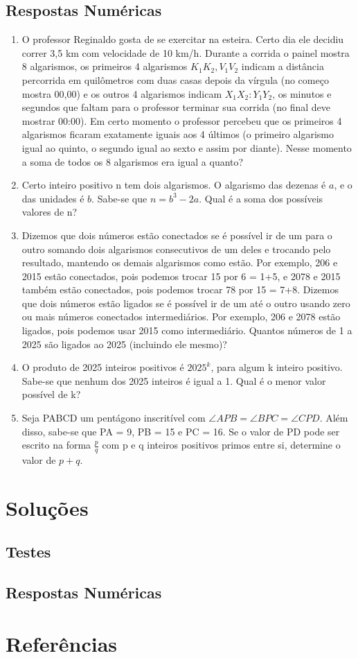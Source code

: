 \documentclass[12pt]{article}
\begin{document}
    \subsection{Respostas Numéricas}
      \begin{enumerate}[label=\textbf{\arabic*.}, start=16]
        \item O professor Reginaldo gosta de se exercitar na esteira. Certo dia ele decidiu correr 3,5 km com velocidade de 10 km/h. Durante a corrida o painel mostra 
          8 algarismos, os primeiros 4 algarismos \(K_1K_2,V_1V_2\) indicam a distância percorrida em quilômetros com duas casas depois da vírgula (no começo mostra 00,00) e os outros
          4 algarismos indicam \(X_1X_2:Y_1Y_2\), os minutos e segundos que faltam para o professor terminar sua corrida (no final deve mostrar 00:00). Em certo momento o professor
          percebeu que os primeiros 4 algarismos ficaram exatamente iguais aos 4 últimos (o primeiro algarismo igual ao quinto, o segundo igual ao sexto e assim por diante). Nesse
          momento a soma de todos os 8 algarismos era igual a quanto?
        \item Certo inteiro positivo n tem dois algarismos. O algarismo das dezenas é \(a\), e o das unidades é \(b\). Sabe-se que \(n = b^3 - 2a\). Qual é a soma dos possíveis
          valores de n?
        \item Dizemos que dois números estão conectados se é possível ir de um para o outro somando dois algarismos consecutivos de um deles e trocando pelo resultado, mantendo
          os demais algarismos como estão. Por exemplo, 206 e 2015 estão conectados, pois podemos trocar 15 por 6 = 1+5, e 2078 e 2015 também estão conectados, pois podemos trocar
          78 por 15 = 7+8. Dizemos que dois números estão ligados se é possível ir de um até o outro usando zero ou mais números conectados intermediários. Por exemplo, 206 e 2078
          estão ligados, pois podemos usar 2015 como intermediário. Quantos números de 1 a 2025 são ligados ao 2025 (incluindo ele mesmo)?
        \item O produto de 2025 inteiros positivos é \(2025^k\), para algum k inteiro positivo. Sabe-se que nenhum dos 2025 inteiros é igual a 1. Qual é o menor valor possível de k?
        \item Seja PABCD um pentágono inscritível com \(\angle APB = \angle BPC = \angle CPD\). Além disso, sabe-se que PA = 9, PB = 15 e PC = 16. Se o valor de PD pode ser escrito
          na forma \(\tfrac{p}{q}\) com p e q inteiros positivos primos entre si, determine o valor de \(p+q\).
      \end{enumerate}
  \clearpage

  \section{\textsf{Soluções}}
    \subsection{Testes}
    \subsection{Respostas Numéricas}

  \clearpage

  \section{\textsf{Referências}}
\end{document}
